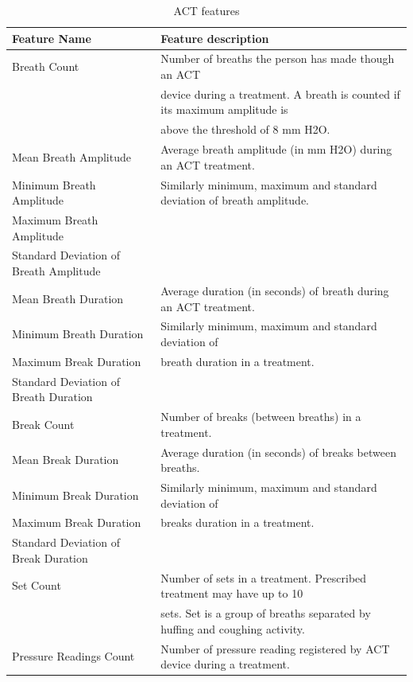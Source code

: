 \documentclass{article}
\begin{document}
\begin{table}[h]
  \caption{ACT features}
  \label{act_features}
  \centering
  \begin{tabular}{ |l|l| }
    \toprule
    \cmidrule(r){1-2}
    \textbf{Feature Name} & \textbf{Feature description} \\
    \midrule
    Breath Count & Number of breaths the person has made though an ACT  \\ 
     ~ & device during a treatment. A breath is counted if its maximum amplitude is \\ ~ & above the threshold of 8 mm H2O.\\
     \midrule
     Mean Breath Amplitude & Average breath amplitude (in mm H2O) during an ACT treatment. \\
     Minimum Breath Amplitude & Similarly minimum, maximum and standard deviation of breath amplitude. \\
     Maximum Breath Amplitude & ~ \\
     Standard Deviation of Breath Amplitude & ~ \\
     \midrule
     Mean Breath Duration & Average duration (in seconds) of breath during an ACT treatment. \\ 
     Minimum Breath Duration &  Similarly minimum, maximum and standard deviation of \\ 
     Maximum Break Duration & breath duration in a treatment. \\
     Standard Deviation of Breath Duration & ~ \\
     \midrule
     Break Count & Number of breaks (between breaths) in a treatment. \\
     \midrule
     Mean Break Duration & Average duration (in seconds) of breaks between breaths. \\ 
     Minimum Break Duration & Similarly minimum, maximum and standard deviation of \\ 
     Maximum Break Duration & breaks duration in a treatment. \\
     Standard Deviation of Break Duration & ~ \\
     \midrule
     Set Count & Number of sets in a treatment. Prescribed treatment may have up to 10 \\
     ~ & sets. Set is a group of breaths separated by huffing and coughing activity. \\
     \midrule
     Pressure Readings Count & Number of pressure reading registered by ACT device during a treatment. \\

\end{tabular}
\end{table}
\end{document}
